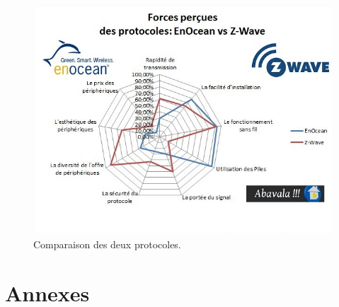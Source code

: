 \documentclass[a4paper,10pt]{article}
\begin{document}
\begin{figure}[H]
\centering\includegraphics[scale=0.7]{forces-enocean-vs-z-wave.jpg}
\caption{Comparaison des deux protocoles.}
\end{figure}

\section{Annexes}


 
\end{document}
